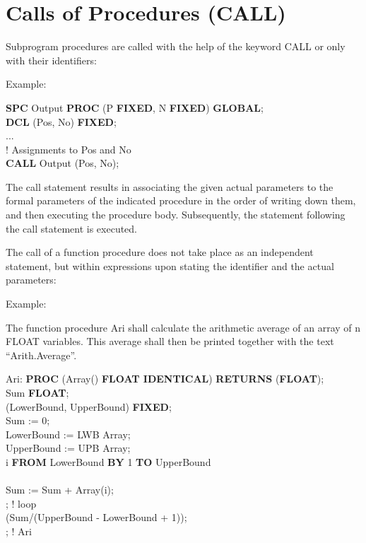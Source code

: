 \section{Calls of Procedures (CALL)}   %
\label{sec_call}

Subprogram procedures are called with the help of the keyword CALL or
only with their identifiers:

 




Example:

{\bf SPC} Output {\bf PROC} (P {\bf FIXED}, N {\bf FIXED}) {\bf GLOBAL};\\
{\bf DCL} (Pos, No) {\bf FIXED};\\
...\\
! Assignments to Pos and No\\
{\bf CALL} Output (Pos, No);

The call statement results in associating the given actual parameters
to the formal parameters of the indicated procedure in the order of
writing down them, and then executing the procedure body. Subsequently,
the statement following the call statement is executed.

The call of a function procedure does not take place as an independent
statement, but within expressions upon stating the identifier and the
actual parameters:



Example:

The function procedure Ari shall calculate the arithmetic average of an
array of n FLOAT variables. This average shall then be printed together
with the text ``Arith.Average''.

Ari: {\bf PROC} (Array() {\bf FLOAT IDENTICAL}) {\bf RETURNS} ({\bf FLOAT});\\
\x {} Sum {\bf FLOAT};\\
\x {} (LowerBound, UpperBound) {\bf FIXED};\\
\x \x Sum := 0;\\
\x \x LowerBound := LWB Array; \\
\x \x UpperBound := UPB Array; \\
\x {} i {\bf FROM} LowerBound {\bf BY} 1 {\bf TO} UpperBound\\
\x {}\\
\x \x \x Sum := Sum + Array(i);\\
\x {}; ! loop\\
\x {} (Sum/(UpperBound - LowerBound + 1));\\
; ! Ari

